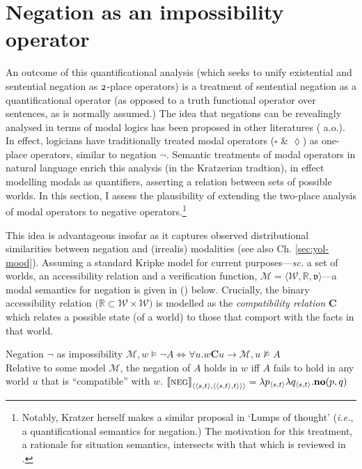 \section{Negation as an impossibility operator}\label{sec:nec-modalneg}
An outcome of this quantificational analysis (which seeks to unify existential and sentential negation as $ \mathnormal2 $-place operators) is a treatment of sentential negation as a quantificational operator (as opposed to a truth functional operator over sentences, as is normally assumed.) The idea that negations can be revealingly analysed in terms of modal logics has been proposed in other literatures (\citealp[see, \textit{e.g.},][]{Wansing2001,Restall1999,Horn2017,Dosen1986,Dunn1993} a.o.). In effect, logicians have traditionally treated modal operators ($ \square $ \& $\lozenge $) as one-place operators, similar to negation $ \boldsymbol\neg $. Semantic treatments of modal operators in natural language enrich this analysis (in the Kratzerian tradtion), in effect modelling modals as quantifiers, asserting a relation between sets of possible worlds. In this section, I assess the plausibility of extending the two-place analysis of modal operators to negative operators.\footnote{Notably, Kratzer herself makes a similar proposal in `Lumps of thought' \citeyearpar[\S~6]{Kratzer1989} (\textit{i.e.}, a quantificational semantics for negation.) The motivation for this treatment, a rationale for situation semantics, intersects with that which is reviewed in \citet[60\textit{ff}]{Restall1999}.}




 This idea is advantageous insofar as it captures observed distributional similarities between negation and (irrealis) modalities (see also Ch. \ref{sec:yol-mood}). Assuming a standard Kripke model for current purposes---\textit{sc.} a set of worlds, an accessibility relation and a verification function, $ \mathcal M=\langle\mathcal{W\!},\mathbb{R,}\mathfrak{v} \rangle $---a modal semantics for negation is given in (\nextx) below. Crucially, the binary accessibility relation $ \big(\mathbb R\subset\mathcal W\times\mathcal W\big) $ is modelled as the \textit{compatibility relation} $ \mathbf{C}  $ which relates a possible state (of a world) to those that comport with the facts in that world.
 

\pex	Negation $ \boldsymbol\neg $ as impossibility
\a$\mathcal M\!,w\vDash\neg A\iff \forall u.w\mathbf C u\to\mathcal M\!,u\not\vDash A$\\
Relative to some model $ \mathcal{M} $, the negation of $ A $ holds in $ w $ iff $ A $ fails to hold in any world $ u $ that is ``compatible'' with $ w $.
\a$ \llbracket{\textsc{neg}}\rrbracket^{}_{\langle\langle s,t\rangle,\langle\langle s,t\rangle,t\rangle\rangle\rangle}=\lambda p_{\langle s,t\rangle}\lambda q_{\langle s,t\rangle}.\textbf{no}(p,q) $\xe


